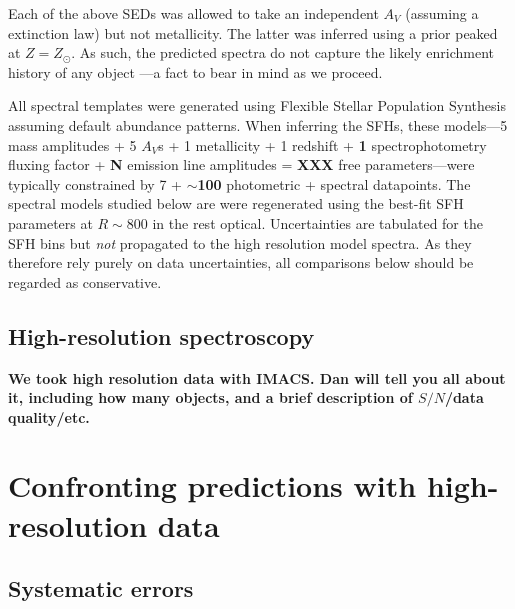 \documentclass[a4paper,fleqn,usenatbib]{mnras}
\newcommand{\bfr}{\bf\color{red}}
\begin{document}
Each of the above SEDs was allowed to take an independent $A_{V}$ (assuming a \citealt{Calzetti00} 
extinction law) but not metallicity. The latter was inferred using a prior peaked at $Z=Z_{\odot}$. As such,
the predicted spectra do not capture the likely enrichment history of any object 
\citep[cf.][]{Pacifici12, Morishita19}---a fact to bear in mind as we proceed.

All spectral templates were generated using Flexible Stellar Population Synthesis 
\citep[FSPS;][]{ConroyGunnWhite09} assuming default abundance patterns. When inferring the SFHs, 
these models---5 mass amplitudes + 5 $A_{V}$s + 1 metallicity + 1 redshift + {\bfr 1} spectrophotometry fluxing 
factor + {\bfr N} emission line amplitudes = {\bfr XXX} free parameters---were typically constrained by 
7 + {\bfr $\sim$100} photometric + spectral datapoints. The spectral models studied below are were 
regenerated using the best-fit SFH parameters at $R\sim800$ in the rest optical. Uncertainties are tabulated
for the SFH bins but {\it not} propagated to the high resolution model spectra. As they therefore rely purely on 
data uncertainties, all comparisons below should be regarded as conservative.

\subsection{High-resolution spectroscopy}
\label{sec: hiRes}

{\bfr We took high resolution data with IMACS. Dan will tell you all about it, including how many objects, 
and a brief description of $S/N$/data quality/etc.}


\section{Confronting predictions with high-resolution data}
\label{sec:results}

\subsection{Systematic errors}
\label{sec:systematics}


\end{document}
